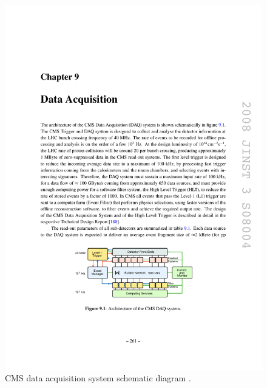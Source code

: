 \begin{figure}[tbh]
\centering
\includegraphics[width=5.5in]{figures/daq.pdf}
\caption{CMS data acquisition system schematic diagram \cite{1748-0221-3-08-S08004}.}
\label{fig:daq}
\end{figure}


